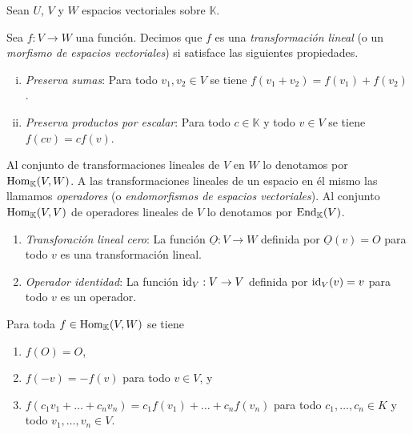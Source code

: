 Sean $U$, $V$ y $W$ espacios vectoriales sobre $\mathbb{K}$.

\begin{defn}\label{deftrli}
Sea $f:V\rightarrow W$ una funci\'on. Decimos que $f$ es una \emph{transformaci\'on lineal} (o un \emph{morfismo de espacios vectoriales}) si satisface las siguientes propiedades.
\begin{enumerate}[(i)]
\item \emph{Preserva sumas}: Para todo $v_1,v_2\in V$ se tiene $f(v_1+v_2)=f(v_1)+f(v_2)$.
\item \emph{Preserva productos por escalar}: Para todo $c\in \mathbb{K}$ y todo $v\in V$ se tiene $f(cv)=cf(v)$. 
\end{enumerate}
Al conjunto de transformaciones lineales de $V$ en $W$ lo denotamos por $\operatorname{Hom}_{\mathbb{K}}(V,W)$. A las transformaciones lineales de un espacio en \'el mismo las llamamos \emph{operadores} (o \emph{endomorfismos de espacios vectoriales}). Al conjunto $\operatorname{Hom}_{\mathbb{K}}(V,V)$ de operadores lineales de $V$ lo denotamos por $\operatorname{End}_{\mathbb{K}}(V)$.
\end{defn}

\begin{ejem}
\begin{enumerate}
\item \emph{Transforaci\'on lineal cero}: La funci\'on $\underline{O}:V\rightarrow W$ definida por $\underline{O}(v)=O$ para todo $v$ es una transformaci\'on lineal.
\item \emph{Operador identidad}: La funci\'on $\operatorname{id}_V:V\rightarrow V$ definida por $\operatorname{id}_V(v)=v$ para todo $v$ es un operador.
\end{enumerate}  
\end{ejem}

\begin{pro}\label{proptrlinbasicas}
Para toda $f\in\operatorname{Hom}_{\mathbb{K}}(V,W)$ se tiene
\begin{enumerate}
\item $f(O)=O$,
\item $f(-v)=-f(v)$ para todo $v\in V$, y
\item $f(c_1v_1+\ldots+c_nv_n)=c_1f(v_1)+\ldots+c_nf(v_n)$ para todo $c_1,\ldots,c_n\in K$ y todo $v_1,\ldots,v_n\in V$.
\end{enumerate}
\end{pro}

